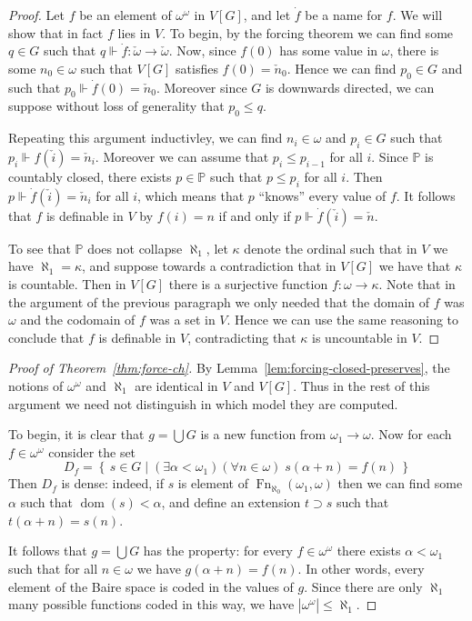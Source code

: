 \documentclass[11pt,oneside]{amsbook}
\newcommand{\set}[1]{\left\{\,#1\,\right\}}
\newcommand{\PP}{\mathbb P}
\newcommand{\forces}{\Vdash}
\DeclareMathOperator{\dom}{dom}
\DeclareMathOperator{\Fn}{Fn}
\theoremstyle{definition}
\theoremstyle{plain}
\theoremstyle{definition}
\theoremstyle{remark}
\numberwithin{equation}{section}
\numberwithin{figure}{section}
\begin{document}
\begin{proof}
  Let $f$ be an element of $\omega^\omega$ in $V[G]$, and let $\dot f$ be a name for $f$. We will show that in fact $f$ lies in $V$. To begin, by the forcing theorem we can find some $q\in G$ such that $q\forces \dot f\colon\check\omega\to\check\omega$. Now, since $f(0)$ has some value in $\omega$, there is some $n_0\in\omega$ such that $V[G]$ satisfies $f(0)=\check n_0$. Hence we can find $p_0\in G$ and such that $p_0\forces\dot f(0)=\check n_0$. Moreover since $G$ is downwards directed, we can suppose without loss of generality that $p_0\leq q$.

  Repeating this argument inductivley, we can find $n_i\in\omega$ and $p_i\in G$ such that $p_i\forces f(\check i)=\check n_i$. Moreover we can assume that $p_i\leq p_{i-1}$ for all $i$. Since $\PP$ is countably closed, there exists $p\in\PP$ such that $p\leq p_i$ for all $i$. Then $p\forces\dot f(\check i)=\check n_i$ for all $i$, which means that $p$ ``knows'' every value of $f$. It follows that $f$ is definable in $V$ by $f(i)=n$ if and only if $p\forces\dot f(\check i)=\check n$.

  To see that $\PP$ does not collapse $\aleph_1$, let $\kappa$ denote the ordinal such that in $V$ we have $\aleph_1=\kappa$, and suppose towards a contradiction that in $V[G]$ we have that $\kappa$ is countable. Then in $V[G]$ there is a surjective function $f\colon\omega\to\kappa$. Note that in the argument of the previous paragraph we only needed that the domain of $f$ was $\omega$ and the codomain of $f$ was a set in $V$. Hence we can use the same reasoning to conclude that $f$ is definable in $V$, contradicting that $\kappa$ is uncountable in $V$.
\end{proof}

\begin{proof}[Proof of Theorem~\ref{thm:force-ch}]
  By Lemma~\ref{lem:forcing-closed-preserves}, the notions of $\omega^\omega$ and $\aleph_1$ are identical in $V$ and $V[G]$. Thus in the rest of this argument we need not distinguish in which model they are computed.

  To begin, it is clear that $g=\bigcup G$ is a new function from $\omega_1\to\omega$. Now for each $f\in\omega^\omega$ consider the set
  \[D_f=\set{s\in G\mid (\exists\alpha<\omega_1)(\forall n\in\omega)\;s(\alpha+n)=f(n)}
  \]
  Then $D_f$ is dense: indeed, if $s$ is element of $\Fn_{\aleph_0}(\omega_1,\omega)$ then we can find some $\alpha$ such that $\dom(s)<\alpha$, and define an extension $t\supset s$ such that $t(\alpha+n)=s(n)$.

  It follows that $g=\bigcup G$ has the property: for every $f\in\omega^\omega$ there exists $\alpha<\omega_1$ such that for all $n\in\omega$ we have $g(\alpha+n)=f(n)$. In other words, every element of the Baire space is coded in the values of $g$. Since there are only $\aleph_1$ many possible functions coded in this way, we have $|\omega^\omega|\leq\aleph_1$.
\end{proof}
\end{document}
